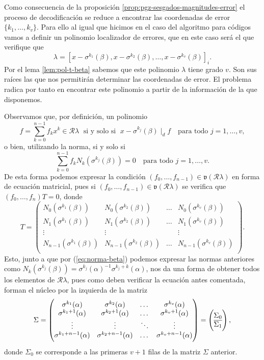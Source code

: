 Como consecuencia de la proposición \ref{prop:pgz-sesgados-magnitudes-error} el proceso de decodificación se reduce a encontrar las coordenadas de error \(\{k_1, \dots, k_v\}\).
Para ello al igual que hicimos en el caso del algoritmo para códigos  vamos a definir un polinomio localizador de errores, que en este caso será el que verifique que 
\[
  \lambda = \left[x - \sigma^{k_1}(\beta), x - \sigma^{k_2}(\beta), \dots, x - \sigma^{k_v}(\beta)\right]_{i}.
\]
Por el lema \ref{lem:pol-t-beta} sabemos que este polinomio \(\lambda\) tiene grado \(v\).
Son sus raíces las que nos permitirán determinar las coordenadas de error.
El problema radica por tanto en encontrar este polinomio a partir de la información de la que disponemos.

Observamos que, por definición, un polinomio 
\[
  f = \sum_{k = 0}^{n-1}f_k x^{k} \in \mathcal R\lambda \;\text{ si y solo si }\; x - \sigma^{k_j}(\beta) \mid_d f \quad\text{para todo } j = 1, \dots, v,
\]
o bien, utilizando la norma, si y solo si
\[
  \sum_{k=0}^{n -1}f_k N_k(\sigma^{k_j}(\beta))= 0 \quad\text{para todo } j = 1, \dots, v.
\]
De esta forma podemos expresar la condición \((f_0, \dots, f_{n-1}) \in \mathfrak v(\mathcal R\lambda)\) en forma de ecuación matricial, pues si \((f_0, \dots, f_{n-1}) \in \mathfrak v(\mathcal R\lambda)\) se verifica que \((f_0, \dots, f_n)T = 0\), donde
\[
  T = \begin{pmatrix}
    N_{0}(\sigma^{k_1}(\beta)) & N_{0}(\sigma^{k_2}(\beta)) & \dots & N_{0}(\sigma^{k_v}(\beta))\\
    N_{1}(\sigma^{k_1}(\beta)) & N_{1}(\sigma^{k_2}(\beta)) & \dots & N_{1}(\sigma^{k_v}(\beta))\\
    \vdots & \vdots & & \vdots\\
    N_{n-1}(\sigma^{k_1}(\beta)) & N_{n-1}(\sigma^{k_2}(\beta)) & \dots & N_{n-1}(\sigma^{k_v}(\beta))\\
  \end{pmatrix}.
\]
Esto, junto a que por (\ref{eq:norma-beta}) podemos expresar las normas anteriores como \(N_k(\sigma^{k_j}(\beta)) = \sigma^{k_j}(\alpha)^{-1}\sigma^{k_j + k}(\alpha)\), nos da una forma de obtener todos los elementos de \(\mathcal R\lambda\), pues como deben verificar la ecuación antes comentada, forman el núcleo por la izquierda de la matriz
\[
  \Sigma = \begin{pmatrix}
    \sigma^{k_1}(\alpha) & \sigma^{k_2}(\alpha) & \dots & \sigma^{k_v}(\alpha)\\
    \sigma^{k_1 + 1}(\alpha) & \sigma^{k_2 + 1}(\alpha) & \dots & \sigma^{k_v + 1}(\alpha)\\
    \vdots & \vdots & \ddots & \vdots \\
    \sigma^{k_1 + n - 1}(\alpha) & \sigma^{k_2 + n - 1}(\alpha) & \dots & \sigma^{k_v + n - 1}(\alpha)\\
  \end{pmatrix}
  = \left( \begin{array}{@{}c@{}}
    \Sigma_0\\\hline
    \Sigma_1
  \end{array}\right),
\]
donde \(\Sigma_0\) se corresponde a las primeras \(v + 1\) filas de la matriz \(\Sigma\) anterior.

